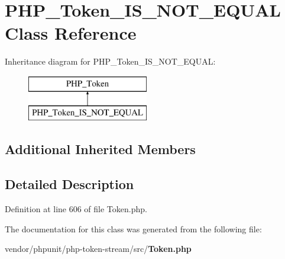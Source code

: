 \section{P\+H\+P\+\_\+\+Token\+\_\+\+I\+S\+\_\+\+N\+O\+T\+\_\+\+E\+Q\+U\+A\+L Class Reference}
\label{class_p_h_p___token___i_s___n_o_t___e_q_u_a_l}
Inheritance diagram for P\+H\+P\+\_\+\+Token\+\_\+\+I\+S\+\_\+\+N\+O\+T\+\_\+\+E\+Q\+U\+A\+L\+:\begin{figure}[H]
\begin{center}
\leavevmode
\includegraphics[height=2.000000cm]{class_p_h_p___token___i_s___n_o_t___e_q_u_a_l}
\end{center}
\end{figure}
\subsection*{Additional Inherited Members}


\subsection{Detailed Description}


Definition at line 606 of file Token.\+php.



The documentation for this class was generated from the following file\+:\begin{DoxyCompactItemize}
\item 
vendor/phpunit/php-\/token-\/stream/src/{\bf Token.\+php}\end{DoxyCompactItemize}
